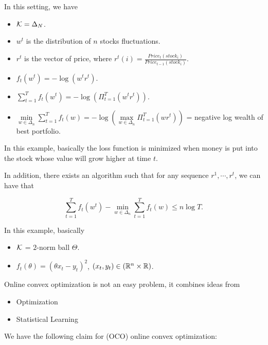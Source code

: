 \documentclass[../main.tex]{subfiles}
\begin{document}
\begin{example}
	In this setting, we have
	
	\begin{itemize}
		\item $\mathcal{K} = \Delta_N$.
		\item $w^t$ is the distribution of $n$ stocks fluctuations.
		\item $r^t$ is the vector of price, where $r^t(i) = \frac{Price_t(stock_i)}{Price_{t-1}(stock_i)}$.
		\item $f_t(w^t) = -\log(w^t r^t) $.
		\item $\sum\limits_{t=1}^T f_t(w^t) = -\log(\Pi_{t= 1}^T (w^t r^t)) $.
		\item $\min\limits_{w\in \Delta_n} \sum\limits_{t=1}^T f_t(w) = -\log(\max\limits_{w\in \Delta_n} \Pi_{t= 1}^T (w r^t)) $ = negative log wealth of best portfolio.
	\end{itemize}
	
	In this example, basically the loss function is minimized when money is put into the stock whose value will grow higher at time $t$. 
	
	In addition, there exists an algorithm such that for any sequence $r^1, \cdots , r^t$, we can have that 
	
	\begin{equation*}
		\sum\limits_{t=1}^T f_t(w^t) - \min\limits_{w \in \Delta_n} \sum\limits_{t=1}^T f_t(w) \leq n \log T.
	\end{equation*}
\end{example}

\begin{example}
	In this example, basically 
	\begin{itemize}
		\item $\mathcal{K}$ = $2$-norm ball $\Theta$.
		\item $f_t(\theta) = (\theta x_t - y_t)^2$, $(x_t, y_t) \in (\mathbb{R}^n \times \mathbb{R})$.
	\end{itemize}
\end{example}

Online convex optimization is not an easy problem, it combines ideas from

\begin{itemize}
	\item Optimization
	\item Statistical Learning
\end{itemize}

We have the following claim for (OCO) online convex optimization:
\end{document}
